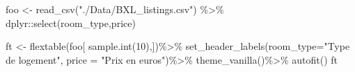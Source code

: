 \documentclass[
]{book}
\newenvironment{Shaded}{\begin{snugshade}}{\end{snugshade}}
\newcommand{\AttributeTok}[1]{\textcolor[rgb]{0.77,0.63,0.00}{#1}}
\newcommand{\DecValTok}[1]{\textcolor[rgb]{0.00,0.00,0.81}{#1}}
\newcommand{\FunctionTok}[1]{\textcolor[rgb]{0.00,0.00,0.00}{#1}}
\newcommand{\NormalTok}[1]{#1}
\newcommand{\OtherTok}[1]{\textcolor[rgb]{0.56,0.35,0.01}{#1}}
\newcommand{\SpecialCharTok}[1]{\textcolor[rgb]{0.00,0.00,0.00}{#1}}
\newcommand{\StringTok}[1]{\textcolor[rgb]{0.31,0.60,0.02}{#1}}
\begin{document}
\begin{Shaded}
\begin{Highlighting}[]
\NormalTok{foo }\OtherTok{\textless{}{-}} \FunctionTok{read\_csv}\NormalTok{(}\StringTok{"./Data/BXL\_listings.csv"}\NormalTok{) }\SpecialCharTok{\%\textgreater{}\%}
\NormalTok{  dplyr}\SpecialCharTok{::}\FunctionTok{select}\NormalTok{(room\_type,price) }

\NormalTok{ft }\OtherTok{\textless{}{-}} \FunctionTok{flextable}\NormalTok{(foo[ }\FunctionTok{sample.int}\NormalTok{(}\DecValTok{10}\NormalTok{),])}\SpecialCharTok{\%\textgreater{}\%}
   \FunctionTok{set\_header\_labels}\NormalTok{(}\AttributeTok{room\_type=}\StringTok{"Type de logement"}\NormalTok{,}
  \AttributeTok{price =} \StringTok{"Prix en euros"}\NormalTok{)}\SpecialCharTok{\%\textgreater{}\%}
  \FunctionTok{theme\_vanilla}\NormalTok{()}\SpecialCharTok{\%\textgreater{}\%}
  \FunctionTok{autofit}\NormalTok{()}
\NormalTok{ft}
\end{Highlighting}
\end{Shaded}

\providecommand{\docline}[3]{\noalign{\global\setlength{\arrayrulewidth}{#1}}\arrayrulecolor[HTML]{#2}\cline{#3}}

\setlength{\tabcolsep}{2pt}

\renewcommand*{\arraystretch}{1.5}
\end{document}
